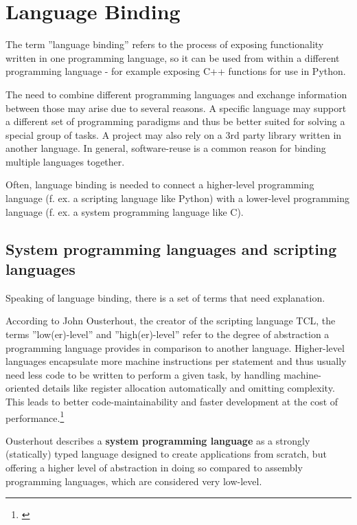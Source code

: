 \chapter{Language Binding}

The term ''language binding'' refers to the process of exposing functionality written in one programming language, so it can be used from within a different programming language - for example exposing C++ functions for use in Python.

The need to combine different programming languages and exchange information between those may arise due to several reasons. A specific language may support a different set of programming paradigms and thus be better suited for solving a special group of tasks. A project may also rely on a 3rd party library written in another language. In general, software-reuse is a common reason for binding multiple languages together.

Often, language binding is needed to connect a higher-level programming language (f. ex. a scripting language like Python) with a lower-level programming language (f. ex. a system programming language like C).

\section{System programming languages and scripting languages}

Speaking of language binding, there is a set of terms that need explanation.

According to John Ousterhout, the creator of the scripting language TCL, the terms ''low(er)-level'' and ''high(er)-level'' refer to the degree of abstraction a programming language provides in comparison to another language. Higher-level languages encapsulate more machine instructions per statement and thus usually need less code to be written to perform a given task, by handling machine-oriented details like register allocation automatically and omitting complexity. This leads to better code-maintainability and faster development at the cost of performance.\footnote{\citep{Ousterhout}}

Ousterhout describes a \textbf{system programming language} as a strongly (statically) typed language designed to create applications from scratch, but offering a higher level of abstraction in doing so compared to assembly programming languages, which are considered very low-level.

